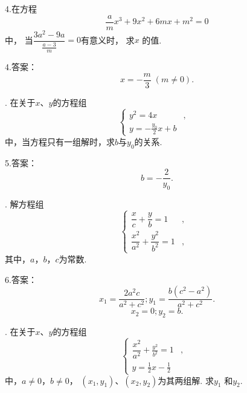 \documentclass[UTF8]{ctexart}
\begin{document}
\noindent 4.在方程$$\dfrac{a}{m}x^3+9x^2+6mx+m^2=0$$中，
当$\dfrac{3a^2-9a}{\frac{a-3}{m}}=0$有意义时， 求$x$ 的值.\vspace{3cm}
    
\noindent 4.答案： $$x=-\dfrac{m}{3}\;(m\neq0).$$
      \newpage
    
. 在关于$x$、$y$的方程组\begin{equation*}
    \left\{
    \begin{aligned}
     y^2=4x&,& \\
     y=-\frac{y_0}{2}x+b& &
    \end{aligned}
    \right.
    \end{equation*}中，当方程只有一组解时，求$b$与$y_0$的关系.\vspace{3cm}
    
\noindent 5.答案： $$b=-\dfrac{2}{y_0}.$$
      \newpage
    
. 解方程组\begin{equation*}
    \left\{
    \begin{aligned}
     \dfrac{x}{c}+\dfrac{y}{b}=1&,& \\
     \dfrac{x^2}{a^2}+\dfrac{y^2}{b^2}=1&,&
    \end{aligned}
    \right.
    \end{equation*}其中，$a$，$b$，$c$为常数.\vspace{3cm}
    
\noindent 6.答案： $$x_1=\dfrac{2a^2c}{a^2+c^2}; y_1=\dfrac{b(c^2-a^2)}{a^2+c^2}.$$
     $$x_2=0; y_2=b.$$
      \newpage
    
. 在关于$x$、$y$的方程组\begin{equation*}
    \left\{
    \begin{aligned}
     \dfrac{x^2}{a^2}+\frac{y^2}{b^2}=1&,& \\
     y=\frac12x-\frac12& &
    \end{aligned}
    \right.
    \end{equation*}中，$a\neq0$，$b\neq0$， $(x_1,y_1)$、$(x_2,y_2)$为其两组解. 求$y_1$ 和$y_2$.\vspace{3cm}
    
\end{document}
